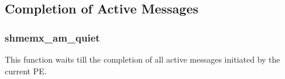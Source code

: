 \subsection{Completion of Active Messages}

\subsubsection{shmemx\_am\_quiet}
This function waits till the completion of all 
active messages initiated by the current PE.\\


